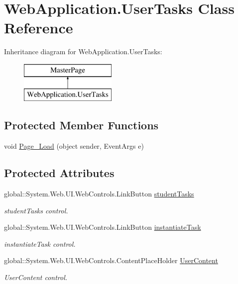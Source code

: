 \hypertarget{classWebApplication_1_1UserTasks}{}\section{Web\+Application.\+User\+Tasks Class Reference}
\label{classWebApplication_1_1UserTasks}
Inheritance diagram for Web\+Application.\+User\+Tasks\+:\begin{figure}[H]
\begin{center}
\leavevmode
\includegraphics[height=2.000000cm]{d3/d4e/classWebApplication_1_1UserTasks}
\end{center}
\end{figure}
\subsection*{Protected Member Functions}
\begin{DoxyCompactItemize}
\item 
void \mbox{\hyperlink{classWebApplication_1_1UserTasks_a741bea9ced0083590cfa88d43b5441df}{Page\+\_\+\+Load}} (object sender, Event\+Args e)
\end{DoxyCompactItemize}
\subsection*{Protected Attributes}
\begin{DoxyCompactItemize}
\item 
global\+::\+System.\+Web.\+U\+I.\+Web\+Controls.\+Link\+Button \mbox{\hyperlink{classWebApplication_1_1UserTasks_aaa0fb97811010af96c39e8df2fff1ce1}{student\+Tasks}}
\begin{DoxyCompactList}\small\item\em student\+Tasks control. \end{DoxyCompactList}\item 
global\+::\+System.\+Web.\+U\+I.\+Web\+Controls.\+Link\+Button \mbox{\hyperlink{classWebApplication_1_1UserTasks_a7ec5d9265d11d31008f586487e1f31c2}{instantiate\+Task}}
\begin{DoxyCompactList}\small\item\em instantiate\+Task control. \end{DoxyCompactList}\item 
global\+::\+System.\+Web.\+U\+I.\+Web\+Controls.\+Content\+Place\+Holder \mbox{\hyperlink{classWebApplication_1_1UserTasks_aa929c7e9c76317af65221bfb4ead895d}{User\+Content}}
\begin{DoxyCompactList}\small\item\em User\+Content control. \end{DoxyCompactList}\end{DoxyCompactItemize}



